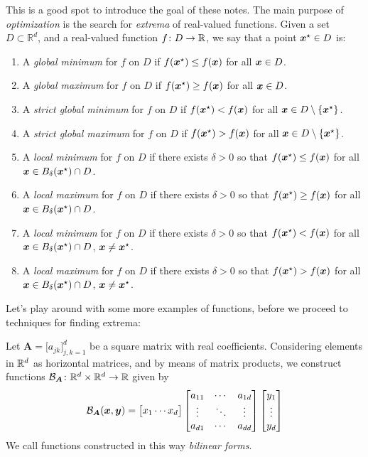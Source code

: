 This is a good spot to introduce the goal of these notes.  The main purpose of \emph{optimization} is the search for \emph{extrema} of real-valued functions.  Given a set $D \subset \mathbb{R}^d$, and a real-valued function $f\colon D \to \mathbb{R}$, we say that a point $\boldsymbol{x}^{\star} \in D$ is:
\begin{enumerate}
	\item A \emph{global minimum} for $f$ on $D$ if $f(\boldsymbol{x}^{\star}) \leq f(\boldsymbol{x})$ for all $\boldsymbol{x} \in D$.
	\item A \emph{global maximum} for $f$ on $D$ if $f(\boldsymbol{x}^{\star}) \geq f(\boldsymbol{x})$ for all $\boldsymbol{x} \in D$.
	\item A \emph{strict global minimum} for $f$ on $D$ if $f(\boldsymbol{x}^{\star}) < f(\boldsymbol{x})$ for all $\boldsymbol{x} \in D \setminus \{ \boldsymbol{x}^{\star} \}$.
	\item A \emph{strict global maximum} for $f$ on $D$ if $f(\boldsymbol{x}^{\star}) > f(\boldsymbol{x})$ for all $\boldsymbol{x} \in D \setminus \{ \boldsymbol{x}^{\star} \}$.
	\item A \emph{local minimum} for $f$ on $D$ if there exists $\delta>0$ so that  $f(\boldsymbol{x}^{\star}) \leq f(\boldsymbol{x})$ for all $\boldsymbol{x} \in B_\delta(\boldsymbol{x}^{\star})\cap D$.
	\item A \emph{local maximum} for $f$ on $D$ if there exists $\delta>0$ so that  $f(\boldsymbol{x}^{\star}) \geq f(\boldsymbol{x})$ for all $\boldsymbol{x} \in B_\delta(\boldsymbol{x}^{\star})\cap D$.
	\item A \emph{local minimum} for $f$ on $D$ if there exists $\delta>0$ so that  $f(\boldsymbol{x}^{\star}) < f(\boldsymbol{x})$ for all $\boldsymbol{x} \in B_\delta(\boldsymbol{x}^{\star})\cap D$, $\boldsymbol{x} \neq \boldsymbol{x}^{\star}$.
	\item A \emph{local maximum} for $f$ on $D$ if there exists $\delta>0$ so that  $f(\boldsymbol{x}^{\star}) > f(\boldsymbol{x})$ for all $\boldsymbol{x} \in B_\delta(\boldsymbol{x}^{\star})\cap D$, $\boldsymbol{x} \neq \boldsymbol{x}^{\star}$.
\end{enumerate}

Let's play around with some more examples of functions, before we proceed to techniques for finding extrema:

\begin{example}\label{example:BilinearForm}
Let $\boldsymbol{A} = \big[ a_{jk} \big]_{j,k=1}^d$ be a square matrix with real coefficients.  Considering elements in $\mathbb{R}^d$ as horizontal matrices, and by means of matrix products, we construct functions $\mathcal{B}_{\boldsymbol{A}} \colon \mathbb{R}^d \times \mathbb{R}^d \to \mathbb{R}$ given by
\begin{equation*}
\mathcal{B}_{\boldsymbol{A}}(\boldsymbol{x}, \boldsymbol{y}) = \begin{bmatrix} x_1 \dotsb x_d \end{bmatrix} \begin{bmatrix} a_{11} &\dotsb &a_{1d} \\ \vdots & \ddots & \vdots \\ a_{d1} &\dotsb &a_{dd} \end{bmatrix} \begin{bmatrix} y_1 \\ \vdots \\ y_d \end{bmatrix}
\end{equation*}
We call functions constructed in this way \emph{bilinear forms}.
\end{example}

